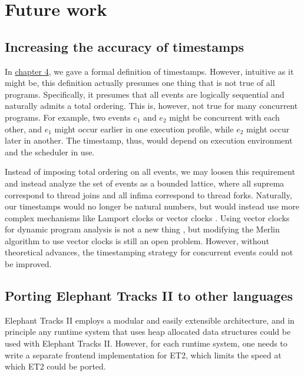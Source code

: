 \section{Future work}
\subsection{Increasing the accuracy of timestamps}
In \hyperref[subsec:timestamp]{chapter 4}, we gave a formal definition of timestamps. However, intuitive as it might be, this definition actually presumes
one thing that is not true of all programs. Specifically, it presumes that all events are logically sequential and naturally admits a total ordering. This
is, however, not true for many concurrent programs. For example, two events $e_1$ and $e_2$ might be concurrent with each other, and $e_1$ might occur earlier
in one execution profile, while $e_2$ might occur later in another. The timestamp, thus, would depend on execution environment and the scheduler in use.

Instead of imposing total ordering on all events, we may loosen this requirement and instead analyze the set of events as a bounded lattice, where all
suprema correspond to thread joins and all infima correspond to thread forks. Naturally, our timestamps would no longer be natural numbers, but would
instead use more complex mechanisms like Lamport clocks \citep{LamportClock} or vector clocks \citep{VectorClock}. Using vector clocks for dynamic program
analysis is not a new thing \citep{Pacer}, but modifying the Merlin algorithm to use vector clocks is still an open problem. However, without theoretical
advances, the timestamping strategy for concurrent events could not be improved.

\subsection{Porting Elephant Tracks II to other languages}
Elephant Tracks II employs a modular and easily extensible architecture, and in principle any runtime system
that uses heap allocated data structures could be used with Elephant Tracks II. However, for each runtime system, one needs to write a separate frontend
implementation for ET2, which limits the speed at which ET2 could be ported.


